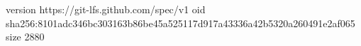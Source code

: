 version https://git-lfs.github.com/spec/v1
oid sha256:8101adc346bc303163b86be45a525117d917a43336a42b5320a260491e2af065
size 2880
